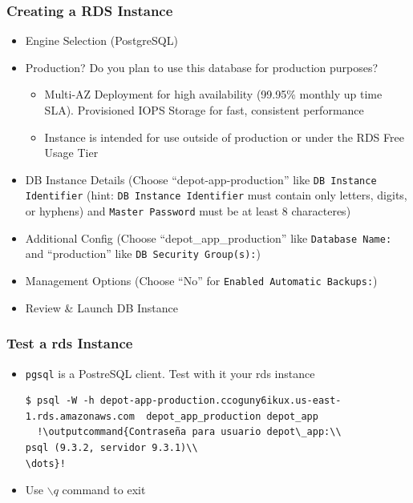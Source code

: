 \documentclass{beamer}
\newcommand{\outputcommand}[1]{\color{darkgreen}{#1}}
\begin{document}
\begin{frame}
\frametitle{Creating a RDS Instance}
\begin{itemize}
 \item Engine Selection (PostgreSQL)
 \item Production? Do you plan to use this database for production purposes?
    \begin{itemize}
      \item Multi-AZ Deployment for high availability (99.95\% monthly up time SLA). Provisioned IOPS Storage for fast, consistent performance
      \item Instance is intended for use outside of production or under the \alert{RDS Free Usage Tier}
    \end{itemize}
 \item DB Instance Details (Choose ``depot-app-production'' like \texttt{DB Instance Identifier} (hint: \texttt{DB Instance Identifier} must contain only letters, digits, or hyphens) and \texttt{Master Password} must be at least 8 characteres)
  \item Additional Config (Choose ``depot\_app\_production'' like \texttt{Database Name:} and ``production'' like \texttt{DB Security Group(s):})
  \item Management Options (Choose ``No'' for \texttt{Enabled Automatic Backups:}) 
  \item Review \& Launch DB Instance
  \end{itemize}
\end{frame}
\begin{frame}
\frametitle{Test a \acrshort{rds} Instance}
\begin{itemize}
 \item \texttt{pgsql} is a PostreSQL client. Test with it your \acrshort{rds} instance 
 \lstset{language=shell, breaklines=true}
  \begin{lstlisting}[escapechar=!]
  $ psql -W -h depot-app-production.ccoguny6ikux.us-east-1.rds.amazonaws.com  depot_app_production depot_app
  !\outputcommand{Contraseña para usuario depot\_app:\\
psql (9.3.2, servidor 9.3.1)\\
\dots}!
 \end{lstlisting}
\item Use \texttt{$\backslash q$} command to exit 
 \end{itemize}
\end{frame}
\end{document}

